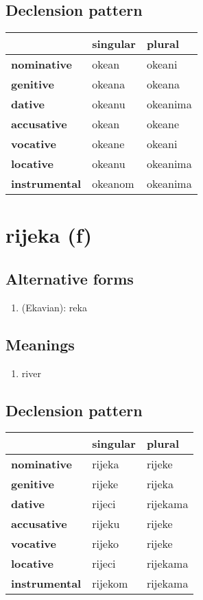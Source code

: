 \subsection*{Declension pattern}
\begin{tabularx}{\linewidth}{Xll}
\toprule
{} & singular &    plural \\
\midrule
\textbf{nominative  } &    okean &    okeani \\
\textbf{genitive    } &   okeana &    okeana \\
\textbf{dative      } &   okeanu &  okeanima \\
\textbf{accusative  } &    okean &    okeane \\
\textbf{vocative    } &   okeane &    okeani \\
\textbf{locative    } &   okeanu &  okeanima \\
\textbf{instrumental} &  okeanom &  okeanima \\
\bottomrule
\end{tabularx}

\filbreak
\section{rijeka (f)}
\subsection*{Alternative forms}
\begin{enumerate}
\item (Ekavian): reka
\end{enumerate}
\subsection*{Meanings}
\begin{enumerate}
\item river
\end{enumerate}
\subsection*{Declension pattern}
\begin{tabularx}{\linewidth}{Xll}
\toprule
{} & singular &    plural \\
\midrule
\textbf{nominative  } &   rijeka &    rijeke \\
\textbf{genitive    } &   rijeke &    rijeka \\
\textbf{dative      } &   rijeci &  rijekama \\
\textbf{accusative  } &   rijeku &    rijeke \\
\textbf{vocative    } &   rijeko &    rijeke \\
\textbf{locative    } &   rijeci &  rijekama \\
\textbf{instrumental} &  rijekom &  rijekama \\
\bottomrule
\end{tabularx}

